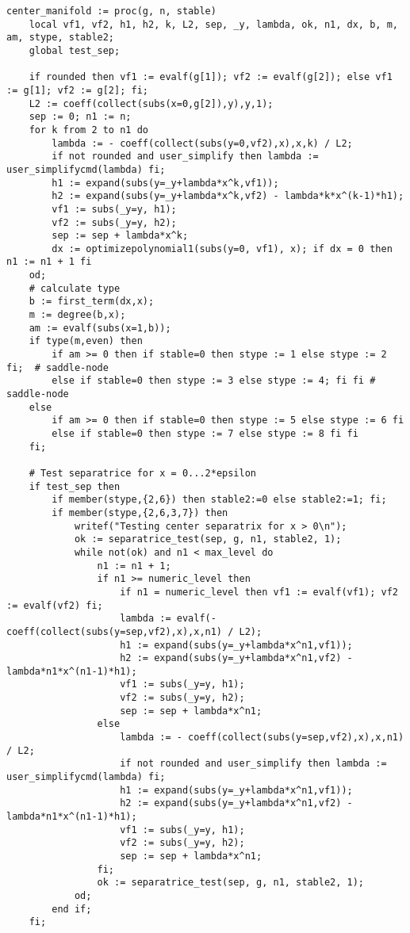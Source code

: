\documentclass[a4paper,10pt]{article}
\begin{document}
\begin{lstlisting}[name=type]
center_manifold := proc(g, n, stable)
    local vf1, vf2, h1, h2, k, L2, sep, _y, lambda, ok, n1, dx, b, m, am, stype, stable2;
    global test_sep;

    if rounded then vf1 := evalf(g[1]); vf2 := evalf(g[2]); else vf1 := g[1]; vf2 := g[2]; fi;
    L2 := coeff(collect(subs(x=0,g[2]),y),y,1);
    sep := 0; n1 := n;
    for k from 2 to n1 do
        lambda := - coeff(collect(subs(y=0,vf2),x),x,k) / L2;
        if not rounded and user_simplify then lambda := user_simplifycmd(lambda) fi;
        h1 := expand(subs(y=_y+lambda*x^k,vf1));
        h2 := expand(subs(y=_y+lambda*x^k,vf2) - lambda*k*x^(k-1)*h1);
        vf1 := subs(_y=y, h1);
        vf2 := subs(_y=y, h2);
        sep := sep + lambda*x^k;
        dx := optimizepolynomial1(subs(y=0, vf1), x); if dx = 0 then n1 := n1 + 1 fi
    od;
    # calculate type
    b := first_term(dx,x);
    m := degree(b,x);
    am := evalf(subs(x=1,b));
    if type(m,even) then
        if am >= 0 then if stable=0 then stype := 1 else stype := 2 fi;  # saddle-node
        else if stable=0 then stype := 3 else stype := 4; fi fi # saddle-node
    else
        if am >= 0 then if stable=0 then stype := 5 else stype := 6 fi
        else if stable=0 then stype := 7 else stype := 8 fi fi
    fi;

    # Test separatrice for x = 0...2*epsilon
    if test_sep then
        if member(stype,{2,6}) then stable2:=0 else stable2:=1; fi;
        if member(stype,{2,6,3,7}) then
            writef("Testing center separatrix for x > 0\n");
            ok := separatrice_test(sep, g, n1, stable2, 1);
            while not(ok) and n1 < max_level do
                n1 := n1 + 1;
                if n1 >= numeric_level then
                    if n1 = numeric_level then vf1 := evalf(vf1); vf2 := evalf(vf2) fi;
                    lambda := evalf(-coeff(collect(subs(y=sep,vf2),x),x,n1) / L2);
                    h1 := expand(subs(y=_y+lambda*x^n1,vf1));
                    h2 := expand(subs(y=_y+lambda*x^n1,vf2) - lambda*n1*x^(n1-1)*h1);
                    vf1 := subs(_y=y, h1);
                    vf2 := subs(_y=y, h2);
                    sep := sep + lambda*x^n1;
                else
                    lambda := - coeff(collect(subs(y=sep,vf2),x),x,n1) / L2;
                    if not rounded and user_simplify then lambda := user_simplifycmd(lambda) fi;
                    h1 := expand(subs(y=_y+lambda*x^n1,vf1));
                    h2 := expand(subs(y=_y+lambda*x^n1,vf2) - lambda*n1*x^(n1-1)*h1);
                    vf1 := subs(_y=y, h1);
                    vf2 := subs(_y=y, h2);
                    sep := sep + lambda*x^n1;
                fi;
                ok := separatrice_test(sep, g, n1, stable2, 1);
            od;
        end if;
    fi;


\end{lstlisting}
\end{document}
